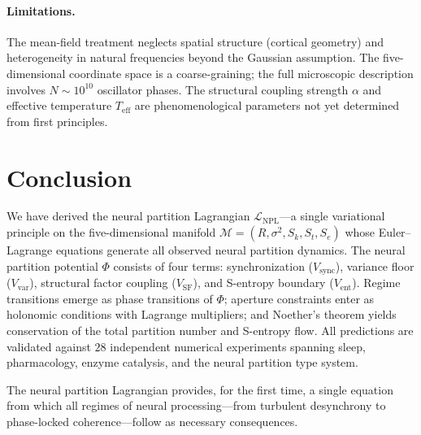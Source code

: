 \documentclass[twocolumn,aps,prl,superscriptaddress,floatfix]{revtex4-2}
\newcommand{\Lag}{\mathcal{L}}
\newcommand{\Pot}{\Phi}
\newcommand{\Sk}{S_k}
\newcommand{\St}{S_t}
\newcommand{\Se}{S_e}
\begin{document}
\paragraph{Limitations.}
The mean-field treatment neglects spatial structure (cortical geometry) and heterogeneity in natural frequencies beyond the Gaussian assumption.
The five-dimensional coordinate space is a coarse-graining; the full microscopic description involves $N \sim 10^{10}$ oscillator phases.
The structural coupling strength $\alpha$ and effective temperature $T_{\mathrm{eff}}$ are phenomenological parameters not yet determined from first principles.


\section{Conclusion}
\label{sec:conclusion}

We have derived the neural partition Lagrangian $\Lag_{\mathrm{NPL}}$---a single variational principle on the five-dimensional manifold $\mathcal{M} = (R, \sigma^2, \Sk, \St, \Se)$ whose Euler--Lagrange equations generate all observed neural partition dynamics.
The neural partition potential $\Pot$ consists of four terms: synchronization ($V_{\mathrm{sync}}$), variance floor ($V_{\mathrm{var}}$), structural factor coupling ($V_{\mathrm{SF}}$), and S-entropy boundary ($V_{\mathrm{ent}}$).
Regime transitions emerge as phase transitions of $\Pot$; aperture constraints enter as holonomic conditions with Lagrange multipliers; and Noether's theorem yields conservation of the total partition number and S-entropy flow.
All predictions are validated against $28$ independent numerical experiments spanning sleep, pharmacology, enzyme catalysis, and the neural partition type system.

The neural partition Lagrangian provides, for the first time, a single equation from which all regimes of neural processing---from turbulent desynchrony to phase-locked coherence---follow as necessary consequences.




\end{document}
